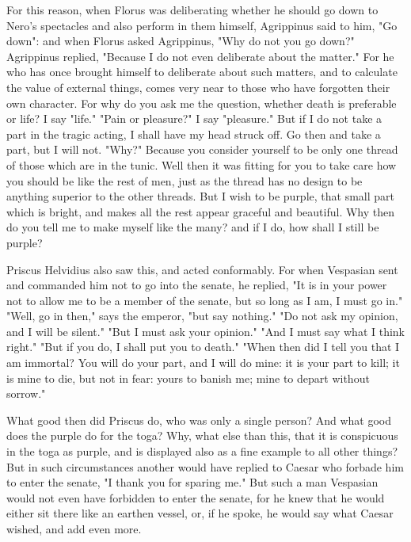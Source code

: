 \documentclass[a4paper]{article}
\begin{document}
For this reason, when Florus was deliberating whether he should go
down to Nero's spectacles and also perform in them himself, Agrippinus
said to him, "Go down": and when Florus asked Agrippinus, "Why do
not you go down?" Agrippinus replied, "Because I do not even deliberate
about the matter." For he who has once brought himself to deliberate
about such matters, and to calculate the value of external things,
comes very near to those who have forgotten their own character. For
why do you ask me the question, whether death is preferable or life?
I say "life." "Pain or pleasure?" I say "pleasure." But if I do not
take a part in the tragic acting, I shall have my head struck off.
Go then and take a part, but I will not. "Why?" Because you consider
yourself to be only one thread of those which are in the tunic. Well
then it was fitting for you to take care how you should be like the
rest of men, just as the thread has no design to be anything superior
to the other threads. But I wish to be purple, that small part which
is bright, and makes all the rest appear graceful and beautiful. Why
then do you tell me to make myself like the many? and if I do, how
shall I still be purple? 

Priscus Helvidius also saw this, and acted conformably. For when Vespasian
sent and commanded him not to go into the senate, he replied, "It
is in your power not to allow me to be a member of the senate, but
so long as I am, I must go in." "Well, go in then," says the emperor,
"but say nothing." "Do not ask my opinion, and I will be silent."
"But I must ask your opinion." "And I must say what I think right."
"But if you do, I shall put you to death." "When then did I tell you
that I am immortal? You will do your part, and I will do mine: it
is your part to kill; it is mine to die, but not in fear: yours to
banish me; mine to depart without sorrow." 

What good then did Priscus do, who was only a single person? And what
good does the purple do for the toga? Why, what else than this, that
it is conspicuous in the toga as purple, and is displayed also as
a fine example to all other things? But in such circumstances another
would have replied to Caesar who forbade him to enter the senate,
"I thank you for sparing me." But such a man Vespasian would not even
have forbidden to enter the senate, for he knew that he would either
sit there like an earthen vessel, or, if he spoke, he would say what
Caesar wished, and add even more. 
\end{document}
